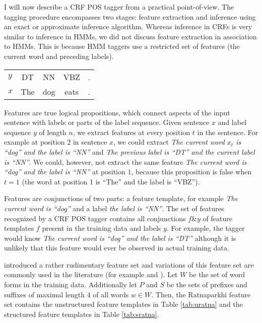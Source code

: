 I will now describe a CRF POS tagger from a practical
point-of-view. The tagging procedure encompasses two stages: feature
extraction and inference using an exact or approximate inference
algorithm. Whereas inference in CRFs is very similar to inference in
HMMs, we did not discuss feature extraction in association to
HMMs. This is because HMM taggers use a restricted set of features
(the current word and preceding labels).

\begin{tabular}{lcccc}
$y$ & DT & NN & VBZ & .\\
$x$ & The & dog & eats & .
\end{tabular}

Features are true logical propositions, which connect aspects of the
input sentence with labels or parts of the label sequence. Given
sentence $x$ and label sequence $y$ of length $n$, we extract features
at every position $t$ in the sentence. For example at position $2$ in
sentence $x$, we could extract {\it The current word $x_t$ is ``dog''
  and the label is ``NN''} and {\it The previous label is ``DT'' and
  the current label is ``NN''}. We could, however, not extract the
same feature {\it The current word is ``dog'' and the label is ``NN''}
at position $1$, because this proposition is false when $t = 1$ (the
word at position 1 is ``The'' and the label is ``VBZ'').

Features are conjunctions of two parts: a feature template, for
example {\it The current word is ``dog''} and a label {\it the
  label is ``NN''}. The set of features recognized by a CRF POS tagger
contains all conjunctions $f \& y$ of feature templates $f$
present in the training data and labels $y$. For example, the tagger
would know {\it The current word is ``dog'' and the label is ``DT''}
although it is unlikely that this feature would ever be observed in
actual training data.

\cite{Ratnaparkhi1996} introduced a rather rudimentary feature set and
variations of this feature set are commonly used in the literature
(for example \cite{Collins2002} and \cite{Lafferty2001}). Let $W$ be
the set of word forms in the training data. Additionally let $P$ and
$S$ be the sets of prefixes and suffixes of maximal length $4$ of all
words $w \in W$. Then, the Ratnaparkhi feature set contains the
unstructured feature templates in Table \ref{tab:uratna} and the
structured feature templates in Table \ref{tab:sratna}.

